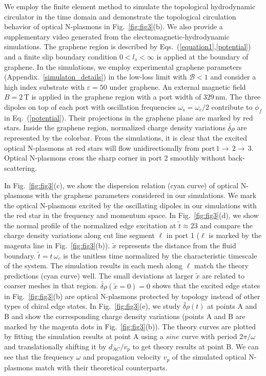 \documentclass[%
reprint,
amsmath,amssymb,
aps,superscriptaddress
]{revtex4-2}
\begin{document}
We employ the finite element method to simulate the topological hydrodynamic circulator in the time domain and demonstrate the topological circulation behavior of optical N-plasmons in Fig.~\ref{fig:fig3}(b). We also provide a supplementary video generated from the electromagnetic-hydrodynamic simulations. The graphene region is described by Eqs.~(\ref{equation1},\ref{potential}) and a finite slip boundary condition $0<l_s<\infty$ is applied at the boundary of graphene. In the simulations, we employ experimental graphene parameters (Appendix.~\ref{simulaton_details}) in the low-loss limit with $\mathcal{B}<1$ and consider a high index substrate with $\varepsilon=50$ under graphene. An external magnetic field $B=2\, \mathrm{T}$ is applied in the graphene region with a port width of $329\, \mathrm{nm}$. The three dipoles on top of each port with oscillation frequencies $\omega_s=\omega_c/2$ contribute to $\phi_f$ in Eq.~(\ref{potential}). Their projections in the graphene plane are marked by red stars. Inside the graphene region, normalized charge density variations $\widetilde{\delta \rho}$ are represented by the colorbar. From the simulations, it is clear that the excited optical N-plasmons at red stars will flow unidirectionally from $\mathrm{port}\, 1 \rightarrow \, 2 \rightarrow \, 3$. Optical N-plasmons cross the sharp corner in port 2 smoothly without back-scattering.

In Fig.~\ref{fig:fig3}(c), we show the dispersion relation (cyan curve) of optical N-plasmons with the graphene parameters considered in our simulations. We mark the optical N-plasmons excited by the oscillating dipoles in our simulations with the red star in the frequency and momentum space. In Fig.~\ref{fig:fig3}(d), we show the normal profile of the normalized edge excitation at $\tilde{t}\approx23$ and compare the charge density variations along cut line segment $\ell$ in port 1 ($\ell$ is marked by the magenta line in Fig.~\ref{fig:fig3}(b)). $\tilde{x}$ represents the distance from the fluid boundary. $\tilde{t}=t \, \omega_c$ is the unitless time normalized by the characteristic timescale of the system. The simulation results in each mesh along $\ell$ match the theory predictions (cyan curve) well. The small deviations at larger $\tilde{x}$ are related to coarser meshes in that region. $\widetilde{\delta \rho}(\tilde{x}=0)=0$ shows that the excited edge states in Fig.~\ref{fig:fig3}(b) are optical N-plasmons protected by topology instead of other types of chiral edge states. In Fig.~\ref{fig:fig3}(e), we study $\widetilde{\delta \rho}(t)$ at points A and B and show the corresponding charge density variations (points A and B are marked by the magenta dots in Fig.~\ref{fig:fig3}(b)). The theory curves are plotted by fitting the simulation results at point A using a $sine$ curve with period $2\pi/\omega$ and translationally shifting it by $d_{AC}/v_p$ to get theory results at point B. We can see that the frequency $\omega$ and propagation velocity $v_p$ of the simulated optical N-plasmons match with their theoretical counterparts.
\end{document}
